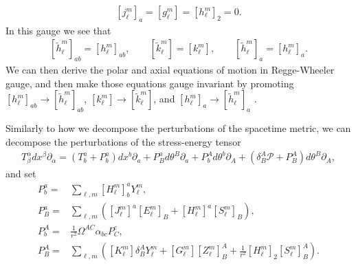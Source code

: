 \documentclass[12pt]{report}
\begin{document}
\begin{align}
\label{eq:regge_wheeler_gauge}
    \boxed{
        \left[j^m_{\ell}\right]_a
        =
        \left[g^m_{\ell}\right]
        =
        \left[h^m_{\ell}\right]_2
        =
        0
        .
    }
\end{align}
In this gauge we see that 
\begin{align}
\label{eq_regge_wheeler_gauge_invar}
    \boxed{
        \left[\tilde{h}^m_{\ell}\right]_{ab}
        = 
        \left[h^m_{\ell}\right]_{ab}
        ,\qquad
        \left[\tilde{k}^m_{\ell}\right]
        =
        \left[k^m_{\ell}\right]
        ,\qquad
        \left[\tilde{h}^m_{\ell}\right]_a
        =
        \left[h^m_{\ell}\right]_a
        .
    }
\end{align}
We can then derive the polar and axial equations of motion in Regge-Wheeler
gauge, and then make those equations gauge invariant
by promoting 
$\left[h^m_{\ell}\right]_{ab}\to\left[\tilde{h}^m_{\ell}\right]_{ab}$,
$\left[k^m_{\ell}\right]\to\left[\tilde{k}^m_{\ell}\right]$,
and
$\left[h^m_{\ell}\right]_a\to\left[\tilde{h}^m_{\ell}\right]_a$ 
\cite{Martel:2005ir}.

Similarly to how we decompose the perturbations of the spacetime metric, 
we can decompose the perturbations of the stress-energy tensor
\begin{align}
    T^{\alpha}_{\beta}dx^{\beta}\partial_{\alpha}
    =
    \left(
        T^{a}_{b} + P^{a}_{b}
    \right)
    dx^b\partial_a
    +
    P^{a}_{B}d\theta^B\partial_a
    +
    P^{A}_{b}d\theta^b\partial_A
    +
    \left(
        \delta^A_B\mathcal{P}
        +
        P^{A}_{B}
    \right)
    d\theta^B\partial_A
    ,
\end{align}
and set
\begin{subequations}
\begin{align}
    P^a_b
    =&
    \sum_{\ell,m} \left[H^m_{\ell}\right]^a_{b} Y^m_{\ell}
    ,\\
    P^a_B
    =&
    \sum_{\ell,m} \left(
        \left[J^m_{\ell}\right]^a \left[E^m_{\ell}\right]_B 
        +
        \left[H^m_{\ell}\right]^a \left[S^m_{\ell}\right]_B
    \right)
    ,\\
    P^A_b
    =&
    \frac{1}{r^2}\Omega^{AC}\alpha_{bc}P^{c}_{C}
    ,\\
    P^A_{B}
    =&
    \sum_{\ell,m} \left(
        \left[K^m_{\ell}\right]\delta^A_B Y^m_{\ell}
        +
        \left[G^m_{\ell}\right]\left[Z^m_{\ell}\right]^A_{B}
        +
        \frac{1}{r^2}\left[H^m_{\ell}\right]_2 \left[S^m_{\ell}\right]^A_{B}
    \right)
    .
\end{align}
\end{subequations}
\end{document}
